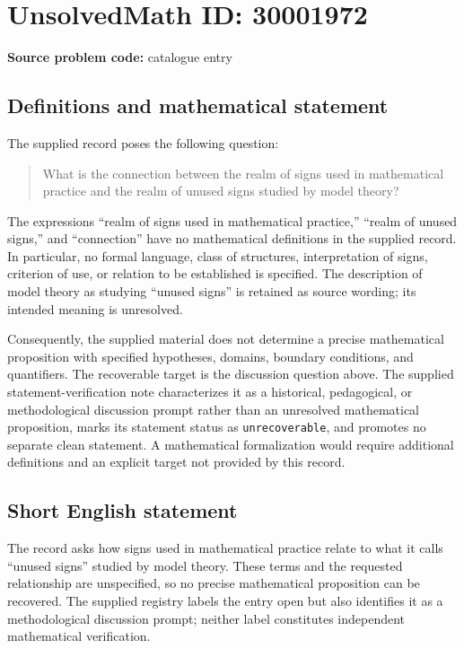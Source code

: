 \documentclass[11pt]{article}
\begin{document}
\section*{UnsolvedMath ID: 30001972}
\textbf{Source problem code:} catalogue entry
\subsection{Definitions and mathematical statement}
The supplied record poses the following question:
\begin{quote}
What is the connection between the realm of signs used in mathematical practice and the realm of unused signs studied by model theory?
\end{quote}
The expressions ``realm of signs used in mathematical practice,'' ``realm of unused signs,'' and ``connection'' have no mathematical definitions in the supplied record. In particular, no formal language, class of structures, interpretation of signs, criterion of use, or relation to be established is specified. The description of model theory as studying ``unused signs'' is retained as source wording; its intended meaning is unresolved.

Consequently, the supplied material does not determine a precise mathematical proposition with specified hypotheses, domains, boundary conditions, and quantifiers. The recoverable target is the discussion question above. The supplied statement-verification note characterizes it as a historical, pedagogical, or methodological discussion prompt rather than an unresolved mathematical proposition, marks its statement status as \texttt{unrecoverable}, and promotes no separate clean statement. A mathematical formalization would require additional definitions and an explicit target not provided by this record.
\subsection{Short English statement}
The record asks how signs used in mathematical practice relate to what it calls ``unused signs'' studied by model theory. These terms and the requested relationship are unspecified, so no precise mathematical proposition can be recovered. The supplied registry labels the entry open but also identifies it as a methodological discussion prompt; neither label constitutes independent mathematical verification.
\end{document}
